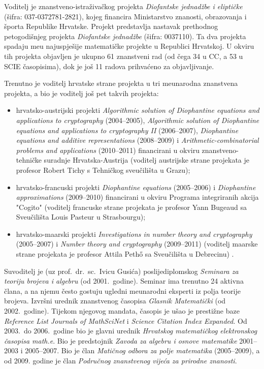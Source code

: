 \documentclass[11pt]{report}
\begin{document}
\newpage

Voditelj je znanstveno-istra\v{z}iva\v{c}kog projekta {\it Diofantske
jednad\v{z}be i elipti\v{c}ke} (\v{s}ifra: 037-0372781-2821), kojeg financira
Ministarstvo znanosti, obrazovanja i \v{s}porta Republike Hrvatske.
Projekt predstavlja nastavak prethodnog
petogodi\v{s}njeg projekta {\it Diofantske jednad\v{z}be} (\v{s}ifra:
0037110). Ta dva projekta spadaju me\dj{}u najuspje\v{s}ije matemati\v{c}ke
projekte u Republici Hrvatskoj. U okviru tih projekta objavljen je ukupno
61 znanstveni rad (od \v{c}ega 34 u CC, a 53 u SCIE \v{c}asopisima), dok je jo\v{s}
11 radova prihva\'ceno za objavljivanje.


Trenutno je voditelj hrvatske strane projekta u tri me{\dj}unarodna
znanstvena projekta, a bio je voditelj jo\v{s} pet takvih projekta:
\begin{itemize}
\item hrvatsko-austrijski projekti {\it Algorithmic solution of Diophantine
equations and applications to cryptography } (2004--2005), {\it Algorithmic solution
of Diophantine equations and applications to cryptography II} (2006--2007),
{\it Diophantine equations and additive representations} (2008--2009) i
{\it Arithmetic-combinatorial problems and applications} (2010--2011) financirani u okviru
znanstveno-tehni\v{c}ke suradnje Hrvatska-Austrija (voditelj
austrijske strane projekata je profesor Robert Tichy s Tehni\v{c}kog
sveu\v{c}ili\v{s}ta u Grazu);
\item hrvatsko-francuski projekti {\it Diophantine equations} (2005--2006)
i {\it Diophantine approximations} (2009--2010)
financirani u okviru Programa integriranih akcija "Cogito" (voditelj francuske strane
projekata je profesor Yann Bugeaud sa Sveu\v{c}ili\v{s}ta Louis Pasteur u Strasbourgu);
\item hrvatsko-ma{\dj}arski projekti
{\it Investigations in number theory and cryptography} (2005--2007) i
{\it Number theory and cryptography} (2009--2011) (voditelj ma{\dj}arske strane projekata je
profesor Attila Peth\H{o} sa Sveu\v{c}ili\v{s}ta u Debrecinu) .
\end{itemize}

\medskip

Suvoditelj je (uz prof.~dr.~sc.~Ivicu Gusi\'ca) poslijediplomskog {\it Seminara za teoriju brojeva
i algebru} (od 2001.~godine).
Seminar ima trenutno 24 aktivna \v{c}lana, a na njemu \v{c}esto gostuju ugledni me\dj{}unarodni eksperti
iz polja teorije brojeva.
Izvr\v{s}ni urednik znanstvenog \v{c}asopisa
{\it Glasnik Matemati\v{c}ki} (od 2002.~godine).
Tijekom njegovog mandata, \v{c}asopis je u\v{s}ao je presti\v{z}ne
baze {\it Reference List Journals of MathSciNet} i {\it Science Citation Index Expanded}.
Od 2003.~do 2006.~godine bio je glavni urednik {\it Hrvatskog matemati\v{c}kog
elektronskog \v{c}asopisa math.e}. Bio je predstojnik {\it Zavoda za
algebru i osnove matematike} 2001--2003 i 2005--2007. Bio je \v{c}lan
{\it Mati\v{c}nog odbora za polje matematika} (2005--2009), a od 2009. godine je
\v{c}lan {\it Podru\v{c}nog znanstvenog vije\'ca za prirodne znanosti}.
\end{document}
